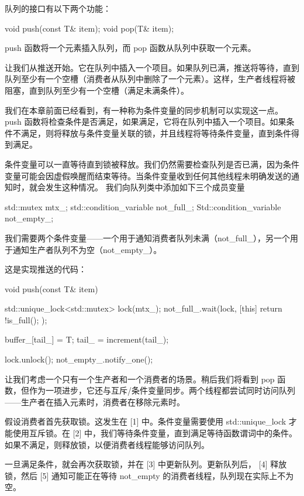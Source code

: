 队列的接口有以下两个功能：

\begin{cpp}
void push(const T& item);
void pop(T& item);
\end{cpp}

push 函数将一个元素插入队列，而 pop 函数从队列中获取一个元素。

让我们从推送开始。它在队列中插入一个项目。如果队列已满，推送将等待，直到队列至少有一个空槽（消费者从队列中删除了一个元素）。这样，生产者线程将被阻塞，直到队列至少有一个空槽（满足未满条件）。

我们在本章前面已经看到，有一种称为条件变量的同步机制可以实现这一点。 push 函数将检查条件是否满足，如果满足，它将在队列中插入一个项目。如果条件不满足，则将释放与条件变量关联的锁，并且线程将等待条件变量，直到条件得到满足。

条件变量可以一直等待直到锁被释放。我们仍然需要检查队列是否已满，因为条件变量可能会因虚假唤醒而结束等待。当条件变量收到任何其他线程未明确发送的通知时，就会发生这种情况。
我们向队列类中添加如下三个成员变量

\begin{cpp}
std::mutex mtx_;
std::condition_variable not_full_;
Std::condition_variable not_empty_;
\end{cpp}

我们需要两个条件变量——一个用于通知消费者队列未满（not\_full\_），另一个用于通知生产者队列不为空（not\_empty\_）。

这是实现推送的代码：

\begin{cpp}
void push(const T& item) {
    std::unique_lock<std::mutex> lock(mtx_);
    not_full_.wait(lock, [this]{ return !is_full(); });

    buffer_[tail_] = T;
    tail_ = increment(tail_);

    lock.unlock();
    not_empty_.notify_one();
}
\end{cpp}

让我们考虑一个只有一个生产者和一个消费者的场景。稍后我们将看到 pop 函数，但作为一项进步，它还与互斥/条件变量同步。两个线程都尝试同时访问队列——生产者在插入元素时，消费者在移除元素时。

假设消费者首先获取锁。这发生在 [1] 中。条件变量需要使用 std::unique\_lock 才能使用互斥锁。在 [2] 中，我们等待条件变量，直到满足等待函数谓词中的条件。如果不满足，则释放锁，以便消费者线程能够访问队列。

一旦满足条件，就会再次获取锁，并在 [3] 中更新队列。更新队列后， [4] 释放锁，然后 [5] 通知可能正在等待 not\_empty 的消费者线程，队列现在实际上不为空。

